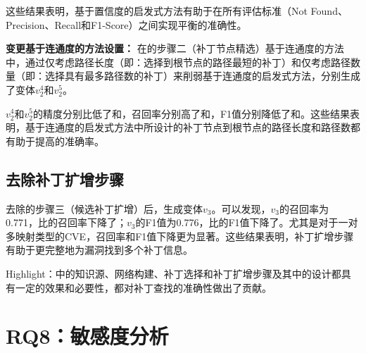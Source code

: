 这些结果表明，基于置信度的启发式方法有助于在所有评估标准（Not Found、Precision、Recall和F1-Score）之间实现平衡的准确性。

\textbf{变更基于连通度的方法设置：}
在\tool 的步骤二（补丁节点精选）基于连通度的方法中，通过仅考虑路径长度（即：选择到根节点的路径最短的补丁）和仅考虑路径数量（即：选择具有最多路径数的补丁）来削弱基于连通度的启发式方法，分别生成了变体$v_2^4$和$v_2^5$。

$v_2^4$和$v_2^5$的精度分别比\tool 低了和，召回率分别高了和，F1值分别降低了和。这些结果表明，基于连通度的启发式方法中所设计的补丁节点到根节点的路径长度和路径数都有助于提高\tool 的准确率。

\subsection{去除补丁扩增步骤}
去除\tool 的步骤三（候选补丁扩增）后，生成变体$v_3$。可以发现，$v_3$的召回率为0.771，比\tool 的召回率下降了；$v_3$的F1值为0.776，比\tool 的F1值下降了。尤其是对于一对多映射类型的CVE，召回率和F1值下降更为显著。这些结果表明，补丁扩增步骤有助于\tool 更完整地为漏洞找到多个补丁信息。

\begin{tcolorbox}[size=title,opacityfill=0.15]
Highlight：\tool 中的知识源、网络构建、补丁选择和补丁扩增步骤及其中的设计都具有一定的效果和必要性，都对\tool  补丁查找的准确性做出了贡献。
\end{tcolorbox}

\section{RQ8：敏感度分析}\label{sec:sensitivity}

